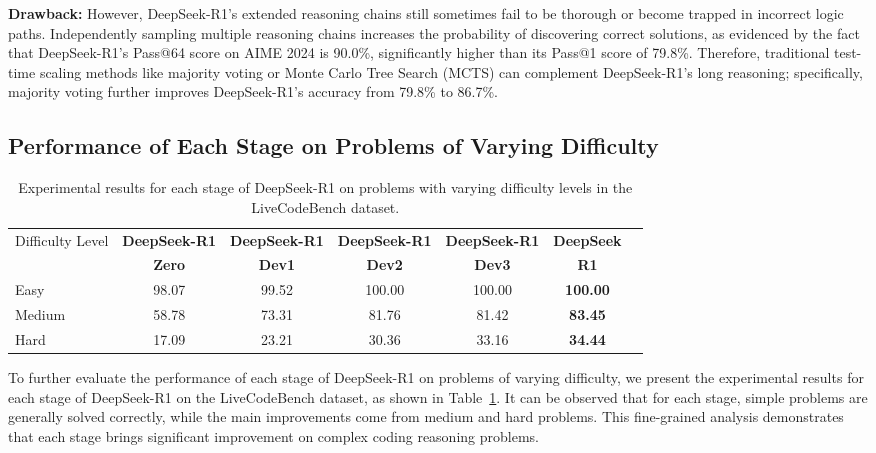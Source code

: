 \documentclass[11pt, a4paper, logo, copyright, nonumbering]{deepseek}
\newcommand{\dsri}{DeepSeek-R1}
\begin{document}
\begin{CJK*}{UTF8}{gbsn}
\textbf{Drawback:} However, \dsri{}'s extended reasoning chains still sometimes fail to be thorough or become trapped in incorrect logic paths.
Independently sampling multiple reasoning chains increases the probability of discovering correct solutions, as evidenced by the fact that \dsri{}'s Pass@64 score on AIME 2024 is 90.0\%, significantly higher than its Pass@1 score of 79.8\%.
Therefore, traditional test-time scaling methods like majority voting or Monte Carlo Tree Search (MCTS) can complement \dsri{}'s long reasoning; specifically, majority voting further improves \dsri{}'s accuracy from 79.8\% to 86.7\%.

\subsection{ Performance of Each Stage on Problems of Varying Difficulty}
\begin{table}[h]
    \centering
    \footnotesize
    \setlength{\tabcolsep}{1.9pt}
    \caption{ Experimental results for each stage of \dsri{} on  problems with varying difficulty levels in the LiveCodeBench dataset.}
    \begin{tabular}{l | c c  c  c |c c@{}}
    \toprule
    \multirow{2}{*}{Difficulty Level} & \textbf{DeepSeek-R1} & \textbf{DeepSeek-R1}  & \textbf{DeepSeek-R1}& \textbf{DeepSeek-R1} &  \textbf{DeepSeek}\\
    & \textbf{Zero}   & \textbf{Dev1}  & \textbf{Dev2} & \textbf{Dev3} & \textbf{R1} \\
    \midrule
     Easy   & 98.07 & 99.52&100.00 & 100.00  &   \textbf{100.00} \\
     Medium   & 58.78 & 73.31&81.76 & 81.42  &   \textbf{83.45} \\
     Hard   & 17.09 & 23.21&30.36 & 33.16  &   \textbf{34.44} \\
    \midrule

    \end{tabular}
    
    \label{tab:difficulty_lcb}
\end{table}

To further evaluate the performance of each stage of \dsri{} on problems of varying difficulty, we present the experimental results for each stage of DeepSeek-R1 on the LiveCodeBench dataset, as shown in Table~\ref{tab:difficulty_lcb}. It can be observed that for each stage, simple problems are generally solved correctly, while the main improvements come from medium and hard problems. This fine-grained analysis demonstrates that each stage brings significant improvement on complex coding reasoning problems.


\end{CJK*}
\end{document}
